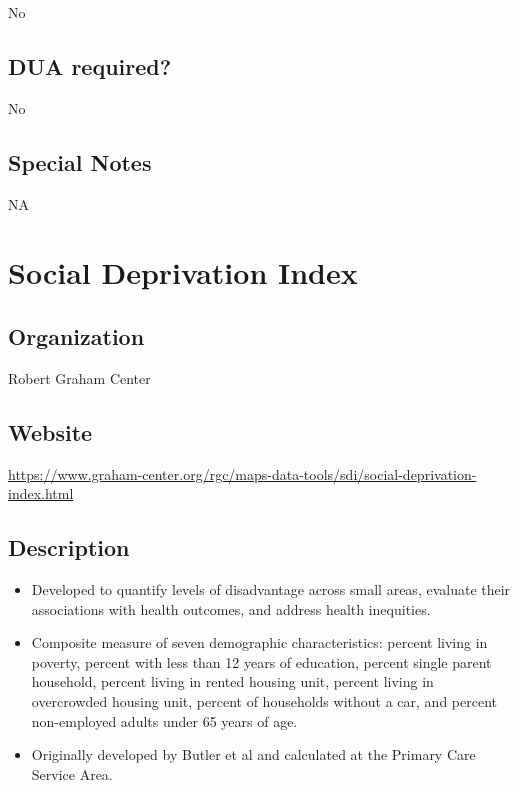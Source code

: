 \documentclass[
]{book}
\providecommand{\tightlist}{%
  \setlength{\itemsep}{0pt}\setlength{\parskip}{0pt}}
\begin{document}
No

\hypertarget{dua-required-79}{%
\section{DUA required?}\label{dua-required-79}}

No

\hypertarget{special-notes-79}{%
\section{Special Notes}\label{special-notes-79}}

NA

\mainmatter

\hypertarget{social-deprivation-index}{%
\chapter{Social Deprivation Index}\label{social-deprivation-index}}

\hypertarget{organization-80}{%
\section{Organization}\label{organization-80}}

Robert Graham Center

\hypertarget{website-80}{%
\section{Website}\label{website-80}}

\url{https://www.graham-center.org/rgc/maps-data-tools/sdi/social-deprivation-index.html}

\hypertarget{description-80}{%
\section{Description}\label{description-80}}

\begin{itemize}
\tightlist
\item
  Developed to quantify levels of disadvantage across small areas, evaluate their associations with health outcomes, and address health inequities.
\item
  Composite measure of seven demographic characteristics: percent living in poverty, percent with less than 12 years of education, percent single parent household, percent living in rented housing unit, percent living in overcrowded housing unit, percent of households without a car, and percent non-employed adults under 65 years of age.
\item
  Originally developed by Butler et al and calculated at the Primary Care Service Area.
\end{itemize}
\end{document}
